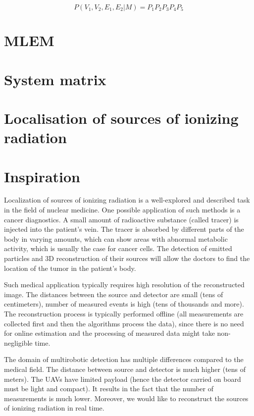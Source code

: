 \begin{equation}
P(V_{1}, V_{2}, E_{1}, E_{2}|M) = P_{1}P_{2}P_{3}P_{4}P_{5} 
\end{equation}


\section{MLEM}

\section{System matrix}


\section{Localisation of sources of ionizing radiation}
\section{Inspiration}
Localization of sources of ionizing radiation is a well-explored and described task in the field of nuclear medicine.
One possible application of such methods is a cancer diagnostics.
A small amount of radioactive substance (called tracer) is injected into the patient's vein.
The tracer is absorbed by different parts of the body in varying amounts, which can show areas with abnormal metabolic activity, which is usually the case for cancer cells.
The detection of emitted particles and 3D reconstruction of their sources will allow the doctors to find the location of the tumor in the patient's body.

Such medical application typically requires high resolution of the reconstructed image.
The distances between the source and detector are small (tens of centimeters), number of measured events is high (tens of thousands and more).
The reconstruction process is typically performed offline (all measurements are collected first and then the algorithms process the data), since there is no need for online estimation and the processing of measured data might take non-negligible time.

The domain of multirobotic detection has multiple differences compared to the medical field.
The distance between source and detector is much higher (tens of meters).
The \ac{UAV}s have limited payload (hence the detector carried on board must be light and compact).
It results in the fact that the number of measurements is much lower.
Moreover, we would like to reconstruct the sources of ionizing radiation in real time.

